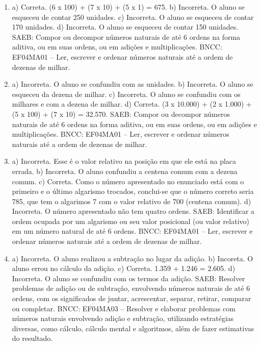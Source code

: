 
\begin{enumerate}
\item
a) Correta. (6 x 100) + (7 x 10) + (5 x 1) = 675.
b) Incorreta. O aluno se esqueceu de contar 250 unidades.
c) Incorreta. O aluno se esqueceu de contar 170 unidades.
d) Incorreta. O aluno se esqueceu de contar 150 unidades.
SAEB: Compor ou decompor números naturais de até 6 ordens na forma aditiva, ou
em suas ordens, ou em adições e multiplicações.
BNCC: EF04MA01 -- Ler, escrever e ordenar números naturais até a ordem de dezenas de milhar.

\item
a) Incorreta. O aluno se confundiu com as unidades.
b) Incorreta. O aluno se esqueceu da dezena de milhar.
c) Incorreta. O aluno se confundiu com os milhares e com a dezena de milhar.
d) Correta. (3 x 10.000) + (2 x 1.000) + (5 x 100) + (7 x 10) = 32.570.
SAEB: Compor ou decompor números naturais de até 6 ordens na forma aditiva, ou
em suas ordens, ou em adições e multiplicações.
BNCC: EF04MA01 -- Ler, escrever e ordenar números naturais até a ordem de dezenas de milhar.

\item
a) Incorreta. Esse é o valor relativo na posição em que ele está na placa errada.
b) Incorreta. O aluno confundiu a centena comum com a dezena comum.
c) Correta. Como o número apresentado no enunciado está com o primeiro e o último
algarismo trocados, conclui-se que o número correto seria 785, que tem o algarimos 7 com o valor relativo de 700 (centena comum).
d) Incorreta. O número apresentado não tem quatro ordens.
SAEB: Identificar a ordem ocupada por um algarismo ou seu valor posicional (ou
valor relativo) em um número natural de até 6 ordens.
BNCC: EF04MA01 -- Ler, escrever e ordenar números naturais até a ordem de dezenas de milhar.

\item
a) Incorreta. O aluno realizou a subtração no lugar da adição.
b) Incoreta. O aluno errou no cálculo da adição.
c) Correta. 1.359 + 1.246 = 2.605.
d) Incorreta. O aluno se confundiu com os termos da adição.
SAEB: Resolver problemas de adição ou de subtração, envolvendo números
naturais de até 6 ordens, com os significados de juntar, acrescentar,
separar, retirar, comparar ou completar.
BNCC: EF04MA03 -- Resolver e elaborar problemas com números naturais envolvendo adição e subtração,
utilizando estratégias diversas, como cálculo, cálculo mental e algoritmos, além de fazer estimativas
do resultado.


\end{enumerate}
